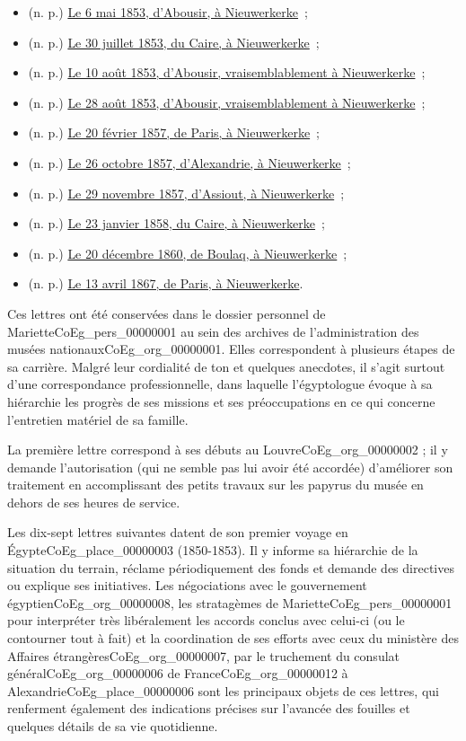 \documentclass{book}
\begin{document}
\begin{itemize}
\item (n. p.) \hyperlink{CoEg_Mariette_1853-05-06}{Le 6 mai 1853, d’Abousir, à Nieuwerkerke}~;
\item (n. p.) \hyperlink{CoEg_Mariette_1853-07-30}{Le 30 juillet 1853, du Caire, à Nieuwerkerke}~;
\item (n. p.) \hyperlink{CoEg_Mariette_1853-08-10}{Le 10 août 1853, d’Abousir, vraisemblablement à Nieuwerkerke}~;
\item (n. p.) \hyperlink{CoEg_Mariette_1853-08-28}{Le 28 août 1853, d’Abousir, vraisemblablement à Nieuwerkerke}~;
\item (n. p.) \hyperlink{CoEg_Mariette_1857-02-20}{Le 20 février 1857, de Paris, à Nieuwerkerke}~;
\item (n. p.) \hyperlink{CoEg_Mariette_1857-10-26}{Le 26 octobre 1857, d’Alexandrie, à Nieuwerkerke}~;
\item (n. p.) \hyperlink{CoEg_Mariette_1857-11-29}{Le 29 novembre 1857, d’Assiout, à Nieuwerkerke}~;
\item (n. p.) \hyperlink{CoEg_Mariette_1858-01-23}{Le 23 janvier 1858, du Caire, à Nieuwerkerke}~;
\item (n. p.) \hyperlink{CoEg_Mariette_1860-12-20}{Le 20 décembre 1860, de Boulaq, à Nieuwerkerke}~;
\item (n. p.) \hyperlink{CoEg_Mariette_1867-04-13}{Le 13 avril 1867, de Paris, à Nieuwerkerke}.
\end{itemize}
\par Ces lettres ont été conservées dans le dossier personnel de Mariette\gls{CoEg_pers_00000001} au sein des archives de l’administration des musées nationaux\gls{CoEg_org_00000001}. Elles correspondent à plusieurs étapes de sa carrière. Malgré leur cordialité de ton et quelques anecdotes, il s’agit surtout d’une correspondance professionnelle, dans laquelle l’égyptologue évoque à sa hiérarchie les progrès de ses missions et ses préoccupations en ce qui concerne l’entretien matériel de sa famille.
\par La première lettre correspond à ses débuts au Louvre\gls{CoEg_org_00000002} ; il y demande l’autorisation (qui ne semble pas lui avoir été accordée) d’améliorer son traitement en accomplissant des petits travaux sur les papyrus du musée en dehors de ses heures de service.
\par Les dix-sept lettres suivantes datent de son premier voyage en Égypte\gls{CoEg_place_00000003} (1850-1853). Il y informe sa hiérarchie de la situation du terrain, réclame périodiquement des fonds et demande des directives ou explique ses initiatives. Les négociations avec le gouvernement égyptien\gls{CoEg_org_00000008}, les stratagèmes de Mariette\gls{CoEg_pers_00000001} pour interpréter très libéralement les accords conclus avec celui-ci (ou le contourner tout à fait) et la coordination de ses efforts avec ceux du ministère des Affaires étrangères\gls{CoEg_org_00000007}, par le truchement du consulat général\gls{CoEg_org_00000006} de France\gls{CoEg_org_00000012} à Alexandrie\gls{CoEg_place_00000006} sont les principaux objets de ces lettres, qui renferment également des indications précises sur l’avancée des fouilles et quelques détails de sa vie quotidienne.
\end{document}
